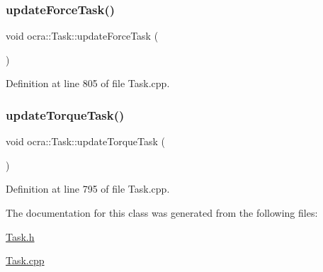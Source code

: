 \subsubsection{\texorpdfstring{update\+Force\+Task()}{updateForceTask()}}
{\footnotesize\ttfamily void ocra\+::\+Task\+::update\+Force\+Task (\begin{DoxyParamCaption}{ }\end{DoxyParamCaption})\hspace{0.3cm}{\ttfamily [protected]}}



Definition at line 805 of file Task.\+cpp.

\hypertarget{classocra_1_1Task_a484d8cb46cd388b065b5d9cd03fa4caa}{}\label{classocra_1_1Task_a484d8cb46cd388b065b5d9cd03fa4caa} 
\subsubsection{\texorpdfstring{update\+Torque\+Task()}{updateTorqueTask()}}
{\footnotesize\ttfamily void ocra\+::\+Task\+::update\+Torque\+Task (\begin{DoxyParamCaption}{ }\end{DoxyParamCaption})\hspace{0.3cm}{\ttfamily [protected]}}



Definition at line 795 of file Task.\+cpp.



The documentation for this class was generated from the following files\+:\begin{DoxyCompactItemize}
\item 
\hyperlink{Task_8h}{Task.\+h}\item 
\hyperlink{Task_8cpp}{Task.\+cpp}\end{DoxyCompactItemize}
